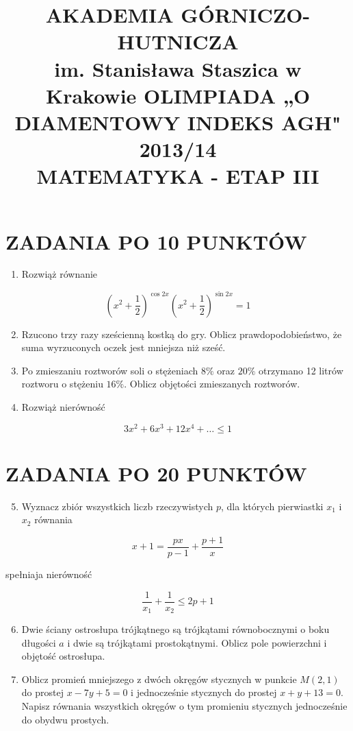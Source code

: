 \documentclass[10pt]{article}
\title{AKADEMIA GÓRNICZO-HUTNICZA \\
 im. Stanisława Staszica w Krakowie OLIMPIADA „O DIAMENTOWY INDEKS AGH" 2013/14 \\
 MATEMATYKA - ETAP III }
\author{}
\date{}
\begin{document}
\maketitle
\section*{ZADANIA PO 10 PUNKTÓW}
\begin{enumerate}
  \item Rozwiąż równanie
\end{enumerate}

$$
\left(x^{2}+\frac{1}{2}\right)^{\cos 2 x}\left(x^{2}+\frac{1}{2}\right)^{\sin 2 x}=1
$$

\begin{enumerate}
  \setcounter{enumi}{1}
  \item Rzucono trzy razy sześcienną kostką do gry. Oblicz prawdopodobieństwo, że suma wyrzuconych oczek jest mniejsza niż sześć.
  \item Po zmieszaniu roztworów soli o stężeniach $8 \%$ oraz $20 \%$ otrzymano 12 litrów roztworu o stężeniu $16 \%$. Oblicz objętości zmieszanych roztworów.
  \item Rozwiąż nierówność
\end{enumerate}

$$
3 x^{2}+6 x^{3}+12 x^{4}+\ldots \leq 1
$$

\section*{ZADANIA PO 20 PUNKTÓW}
\begin{enumerate}
  \setcounter{enumi}{4}
  \item Wyznacz zbiór wszystkich liczb rzeczywistych $p$, dla których pierwiastki $x_{1}$ i $x_{2}$ równania
\end{enumerate}

$$
x+1=\frac{p x}{p-1}+\frac{p+1}{x}
$$

spełniaja nierówność

$$
\frac{1}{x_{1}}+\frac{1}{x_{2}} \leq 2 p+1
$$

\begin{enumerate}
  \setcounter{enumi}{5}
  \item Dwie ściany ostrosłupa trójkątnego są trójkątami równobocznymi o boku długości $a$ i dwie są trójkątami prostokątnymi. Oblicz pole powierzchni i objętość ostrosłupa.
  \item Oblicz promień mniejszego z dwóch okręgów stycznych w punkcie $M(2,1)$ do prostej $x-7 y+5=0$ i jednocześnie stycznych do prostej $x+y+13=0$. Napisz równania wszystkich okręgów o tym promieniu stycznych jednocześnie do obydwu prostych.
\end{enumerate}
\end{document}
